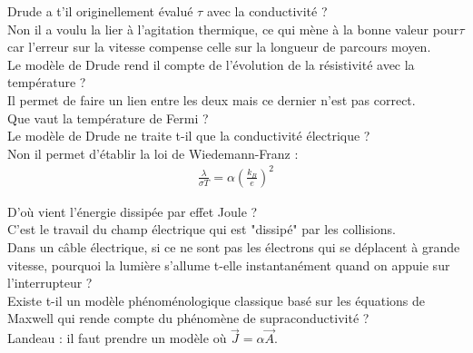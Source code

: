 \documentclass[12pt,prb,aps,epsf]{article}
\begin{document}
Drude a t'il originellement évalué $\tau$ avec la conductivité ?\\
Non il a voulu la lier à l'agitation thermique, ce qui mène à la bonne valeur pour$\tau$ car l'erreur sur la vitesse compense celle sur la longueur de parcours moyen.\\

Le modèle de Drude rend il compte de l'évolution de la résistivité avec la température ?\\
Il permet de faire un lien entre les deux mais ce dernier n'est pas correct.\\

Que vaut la température de Fermi ?\\

Le modèle de Drude ne traite t-il que la conductivité électrique ?\\
Non il permet d'établir la loi de Wiedemann-Franz :
\begin{eqnarray}
\frac{\lambda}{\sigma T} = \alpha \left(\frac{k_B}{e}\right)^2
\end{eqnarray}

D'où vient l'énergie dissipée par effet Joule ?\\
C'est le travail du champ électrique qui est "dissipé" par les collisions.\\

Dans un câble électrique, si ce ne sont pas les électrons qui se déplacent à grande vitesse, pourquoi la lumière s'allume t-elle instantanément quand on appuie sur l'interrupteur ?\\

Existe t-il un modèle phénoménologique classique basé sur les équations de Maxwell qui rende compte du phénomène de supraconductivité ?\\
Landeau : il faut prendre un modèle où $\vec{J} = \alpha \vec{A}$.
\end{document}
